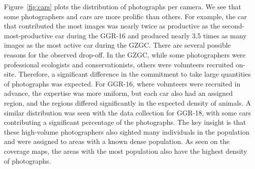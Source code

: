 Figure~\ref{fig:cars} plots the distribution of photographs per camera.  We see that some photographers and cars are more prolific than others.  For example, the car that contributed the most images was nearly twice as productive as the second-most-productive car during the GGR-16 and produced nearly 3.5 times as many images as the most active car during the GZGC.  There are several possible reasons for the observed drop-off. In the GZGC, while some photographers were professional ecologists and conservationists, others were volunteers recruited on-site. Therefore, a significant difference in the commitment to take large quantities of photographs was expected.  For GGR-16, where volunteers were recruited in advance, the expertise was more uniform, but each car also had an assigned region, and the regions differed significantly in the expected density of animals.  A similar distribution was seen with the data collection for GGR-18, with some cars contributing a significant percentage of the photographs.  The key insight is that these high-volume photographers also sighted many individuals in the population and were assigned to areas with a known dense population.  As seen on the coverage maps, the areas with the most population also have the highest density of photographs.

